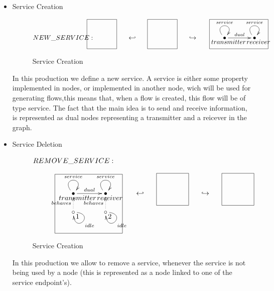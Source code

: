 \documentclass[envcountsect,runningheads]{llncs}
\begin{document}
\begin{itemize}
  \item Service Creation
  \begin{figure}[H]
    \[
       \xymatrix@C=35pt@R=16pt
       {
        {}
         \POS[]-<5pc,0pc>\drop{NEW\_SERVICE:}
         \POS[]+<0pc,.5pc> *+=<3.8pc,3.8pc>[F-]{} & {\hookleftarrow} &
         {}
         \POS[]+<0pc,.5pc> *+=<3.8pc,3.8pc>[F-]{} & {\hookrightarrow} &
         {\bullet} \ar@(ul,ur)^{service} \ar@{->}^{dual}[r] \POS[]-<-0.5pc,.5pc> \drop{transmitter} 
         &
         {\bullet} \ar@(ul,ur)^{service} \POS[]-<-0.5pc,.5pc> \drop{receiver}
         \POS[]+<-2pc,.5pc> *+=<7.5pc,3.8pc>[F-]{} &
      }
    \]
    \caption{Service Creation}
    \protect\label{fig:servicecreation}
  \end{figure}
  In this production we define a new service. A service is either some property 
  implemented in nodes, or implemented in another node, wich will be used for generating 
  flows,this means that, when a flow is created, this flow will be of type service. The fact that the
  main idea is to send and receive information, is represented as dual nodes representing a 
  transmitter and a reicever in the graph.\\
  
  \item Service Deletion
  \begin{figure}[H]
    \[
       \xymatrix@C=35pt@R=16pt
       {
        {} \POS[]-<0pc,0pc>\drop{REMOVE\_SERVICE:}
         \\
         \\
         {\bullet} \ar@(ul,ur)^{service} \ar@{->}^{dual}[r]
         \POS[]-<-0.5pc,.5pc> \drop{transmitter} 
         &
         {\bullet} \ar@(ul,ur)^{service} \POS[]-<-0.5pc,.5pc> \drop{receiver}
         & {\hookleftarrow} &
         {}
         \POS[]+<0pc,.5pc> *+=<3.8pc,3.8pc>[F-]{} & {\hookrightarrow} &
         {}
         \POS[]+<0pc,.5pc> *+=<3.8pc,3.8pc>[F-]{}
         \\
         {\circ} \ar@(r,d)^{idle} \ar@{.>}^{behaves}[u] \POS[]-<-0.5pc,.5pc> \drop{1} &
         {\circ} \ar@(r,d)^{idle} \ar@{.>}^{behaves}[u] \POS[]-<-0.5pc,.5pc> \drop{2}
         \POS[]+<-2pc,1pc> *+=<8pc,7pc>[F-]{}
      }
    \]
    \caption{Service Creation}
    \protect\label{fig:servicecreation}
  \end{figure}
  In this production we allow to remove a service, whenever the service is not
  being used by a node (this is represented as a node linked to one of the service endpoint's).\\
  

\end{itemize}
\end{document}
